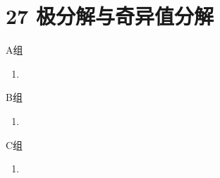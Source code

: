 \section*{27 极分解与奇异值分解}

\vspace{2ex}

\centerline{\heiti A组}
\begin{enumerate}
    \item
\end{enumerate}

\centerline{\heiti B组}
\begin{enumerate}
    \item
\end{enumerate}

\centerline{\heiti C组}
\begin{enumerate}
    \item
\end{enumerate}

\clearpage

